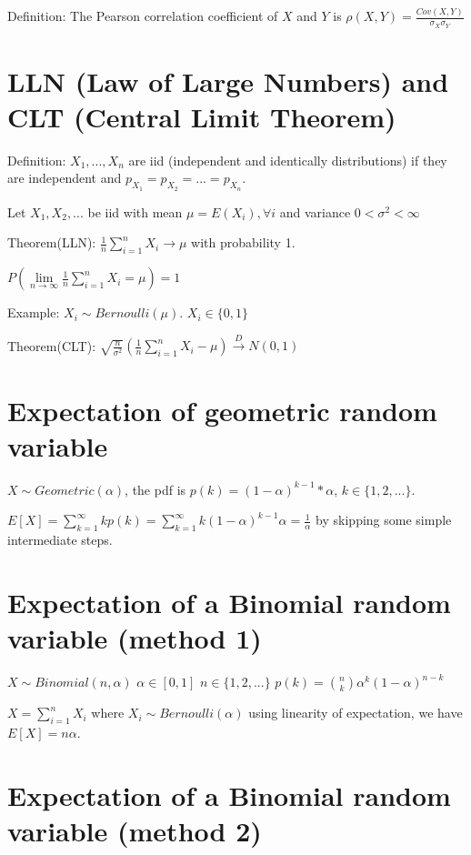 \documentclass[12pt]{article}
\begin{document}
Definition: The Pearson correlation coefficient
of $X$ and $Y$ is $\rho (X,Y)=\frac{Cov(X,Y)}{\sigma_X\sigma_Y}$

\section{LLN (Law of Large Numbers) and CLT (Central Limit Theorem)}

Definition: $X_1,...,X_n$ are iid (independent and identically distributions)
if they are independent and $p_{X_1}=p_{X_2}=...=p_{X_n}$.

Let $X_1,X_2,...$ be iid with mean $\mu=E(X_i),\forall i$
and variance $0<\sigma^2<\infty$

Theorem(LLN): $\frac{1}{n}\sum\limits_{i=1}^{n}X_i\rightarrow\mu$ with probability 1.
\begin{center}
$P(\lim\limits_{n\rightarrow\infty}\frac{1}{n}\sum\limits_{i=1}^{n}X_i=\mu)=1$
\end{center}

Example: $X_i\sim Bernoulli(\mu)$. $X_i\in\{0,1\}$

Theorem(CLT): $\sqrt{\frac{n}{\sigma^2}}(\frac{1}{n}\sum\limits_{i=1}^{n}X_i - \mu) \xrightarrow{D} N(0,1)$

\section{Expectation of geometric random variable}

$X\sim Geometric(\alpha)$, the pdf is $p(k)=(1-\alpha)^{k-1}*\alpha$, $k\in\{1,2,...\}$.

$E[X]=\sum\limits_{k=1}^{\infty}kp(k)=\sum\limits_{k=1}^{\infty}k(1-\alpha)^{k-1}\alpha=\frac{1}{\alpha}$
by skipping some simple intermediate steps.

\section{Expectation of a Binomial random variable (method 1)}

$X\sim Binomial(n,\alpha)$ $\alpha\in[0,1]$ $n\in\{1,2,...\}$ $p(k)=\binom{n}{k}\alpha^k(1-\alpha)^{n-k}$

$X=\sum\limits_{i=1}^{n}X_i$ where $X_i\sim Bernoulli(\alpha)$ using linearity of expectation,
we have $E[X]=n\alpha$.

\section{Expectation of a Binomial random variable (method 2)}
\end{document}
